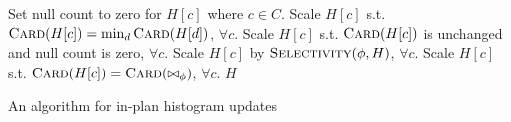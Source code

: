\newcommand{\InlineIte}[3]{#2\ \textbf{if}\ #1\ \textbf{else}\ #3}
\renewcommand{\algorithmicindent}{1em}

\begin{algorithmic}[1]
  
  \label{lst:drop-start}
  \State Set null count to zero for $H[c]$ where $c \in C$.
  \State Scale $H[c]$ s.t. $\Call{Card}{H[c]} = \min_d \Call{Card}{H[d]}$, $\forall c$.\label{lst:drop-end}
  \label{lst:impute-start}
  \State Scale $H[c]$ s.t. $\Call{Card}{H[c]}$ is unchanged and null
  \State count is zero, $\forall c$.\label{lst:impute-end}
  \label{lst:std-start}
  \State Scale $H[c]$ by $\Call{Selectivity}{\phi, H}$, $\forall c$.
  \State Scale $H[c]$ s.t. $\Call{Card}{H[c]} = \Call{Card}{\bowtie_\phi}$, $\forall c$.
  \EndIf\label{lst:std-end}
  \State \Return $H$
  \EndFunction
\end{algorithmic}
\caption{An algorithm for in-plan histogram updates}
\label{algo:histogram-transformation}
  
